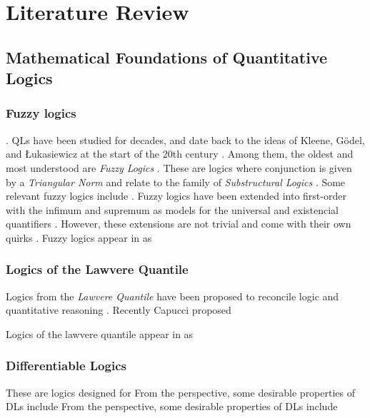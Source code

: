 \chapter{Literature Review} \label{Chapter:LiteratureReview}

\yada
 

\section{Mathematical Foundations of Quantitative Logics}
\subsection{Fuzzy logics}
\yada. QLs have been studied for decades, and date back to the ideas of Kleene, G\"{o}del, and Łukasiewicz at the start of the 20th century \citep{cintula2011handbook, prooffuzzy}. Among them, the oldest and most understood are \emph{Fuzzy Logics} \citep{cintula2011handbook, prooffuzzy}. These are logics where conjunction is given by a \emph{Triangular Norm} \cite{cintula2011handbook, prooffuzzy} 
and relate to the family of \emph{Substructural Logics} \citep{galatos2007residuated}. Some relevant fuzzy logics include \yada. Fuzzy logics have been extended into first-order with the infimum and supremum as models for the universal and existencial quantifiers \mcita{}. However, these extensions are not trivial and come with their own quirks \yada.
Fuzzy logics appear in \AI{} as \yada
{}

\subsection{Logics of the Lawvere Quantile}

Logics from the \emph{Lawvere Quantile} \mcita{} have been proposed to reconcile logic and quantitative reasoning \yada. Recently Capucci proposed \yada 

Logics of the lawvere quantile appear in \AI{} as \yada

\subsection{Differentiable Logics}
These are logics designed for \InAI{} \yada
From the \SiAI{} perspective, some desirable properties of DLs include \yada
From the \SuAI{} perspective, some desirable properties of DLs include \yada
